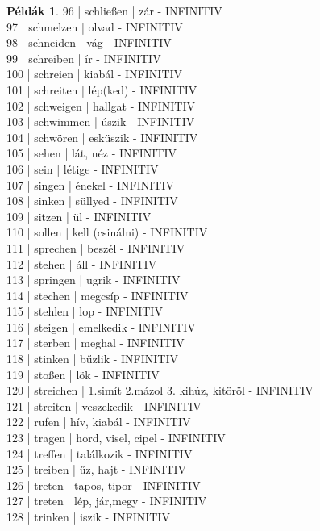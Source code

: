 \documentclass{article}
\theoremstyle{definition}
\newtheorem*{exmp}{Példák}
\begin{document}
\begin{exmp}
96 | schließen | zár - INFINITIV\\
97 | schmelzen | olvad - INFINITIV\\
98 | schneiden | vág - INFINITIV\\
99 | schreiben | ír - INFINITIV\\
100 | schreien | kiabál - INFINITIV\\
101 | schreiten | lép(ked) - INFINITIV\\
102 | schweigen | hallgat - INFINITIV\\
103 | schwimmen | úszik - INFINITIV\\
104 | schwören | esküszik - INFINITIV\\
105 | sehen | lát, néz - INFINITIV\\
106 | sein | létige - INFINITIV\\
107 | singen | énekel - INFINITIV\\
108 | sinken | süllyed - INFINITIV\\
109 | sitzen | ül - INFINITIV\\
110 | sollen | kell (csinálni) - INFINITIV\\
111 | sprechen | beszél - INFINITIV\\
112 | stehen | áll - INFINITIV\\
113 | springen | ugrik - INFINITIV\\
114 | stechen | megcsíp - INFINITIV\\
115 | stehlen | lop - INFINITIV\\
116 | steigen | emelkedik - INFINITIV\\
117 | sterben | meghal - INFINITIV\\
118 | stinken | bűzlik - INFINITIV\\
119 | stoßen | lök - INFINITIV\\
120 | streichen | 1.simít 2.mázol 3. kihúz, kitöröl - INFINITIV\\
121 | streiten | veszekedik - INFINITIV\\
122 | rufen | hív, kiabál - INFINITIV\\
123 | tragen | hord, visel, cipel - INFINITIV\\
124 | treffen | találkozik - INFINITIV\\
125 | treiben | űz, hajt - INFINITIV\\
126 | treten | tapos, tipor - INFINITIV\\
127 | treten | lép, jár,megy - INFINITIV\\
128 | trinken | iszik - INFINITIV\\

\end{exmp}
\end{document}
